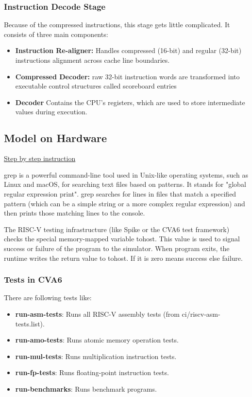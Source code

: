 \documentclass[12pt, a4paper]{article}
\begin{document}
\subsubsection{Instruction Decode Stage}
Because of the compressed instructions, this stage gets little complicated. It consists of three main components:
\begin{itemize}[nosep]
    \item \textbf{Instruction Re-aligner:} Handles compressed (16-bit) and regular (32-bit) instructions alignment across cache line boundaries.
    \item \textbf{Compressed Decoder:} raw 32-bit instruction words are transformed into executable control structures called scoreboard entries
    \item \textbf{Decoder} Contains the CPU's registers, which are used to store intermediate values during execution.
\end{itemize}


\subsection{Model on Hardware}

\href{https://chatgpt.com/share/686529ac-6b08-8005-98f3-5291aa6a2816}{Step by step instruction}

grep is a powerful command-line tool used in Unix-like operating systems, such as Linux and macOS, for searching text files based on patterns. It stands for "global regular expression print". grep searches for lines in files that match a specified pattern (which can be a simple string or a more complex regular expression) and then prints those matching lines to the console.

The RISC-V testing infrastructure (like Spike or the CVA6 test framework) checks the special memory-mapped variable tohost. This value is used to signal success or failure of the program to the simulator.
When program exits, the runtime writes the return value to tohost. If it is zero means success else failure.

\subsubsection{Tests in CVA6}

There are following tests like:

\begin{itemize}[nosep]
    \item \textbf{run-asm-tests}: Runs all RISC-V assembly tests (from ci/riscv-asm-tests.list).
    \item \textbf{run-amo-tests}: Runs atomic memory operation tests.
    \item \textbf{run-mul-tests}: Runs multiplication instruction tests.
    \item \textbf{run-fp-tests}: Runs floating-point instruction tests.
    \item \textbf{run-benchmarks}: Runs benchmark programs.
\end{itemize}
\end{document}

